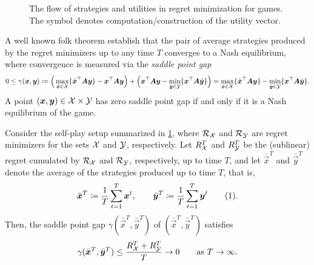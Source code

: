\documentclass{homework}
\begin{document}
\begin{figure}[h]
      \caption{The flow of strategies and utilities in regret minimization for games.
        The symbol \protect\computeutility{} denotes computation/construction of the utility vector.}
      \label{fig:no alternation}
    \end{figure}

    A well known folk theorem establish that the pair of average strategies produced by the regret minimizers up to any time $T$ converges to a Nash equilibrium, where convergence is measured via the \emph{saddle point gap}
    \[
        0 \le \gamma(\bm{x},\bm{y}) \coloneqq \Big(\max_{\hat{\bm{x}}\in\mathcal{X}} \{ \hat{\bm{x}}^\top \bm{A}\bm{y}  \} - \bm{x}^\top \bm{A} \bm{y}\Big) + \Big( \bm{x}^\top \bm{A} \bm{y} - \min_{\hat{\bm{y}} \in \mathcal{Y}} \{\bm{x}^\top \bm{A} \hat{\bm{y}}\}\Big) = \max_{\hat{\bm{x}}\in\mathcal{X}} \{ \hat{\bm{x}}^\top \bm{A}\bm{y}  \}  - \min_{\hat{\bm{y}}\in\mathcal{Y}} \{ \bm{x}^\top \bm{A}\hat{\bm{y}}  \}.
    \] 
    A point $(\bm{x},\bm{y})\in \mathcal{X}\times\mathcal{Y}$ has zero saddle point gap if and only if it is a Nash equilibrium of the game. 

    \begin{theorem}\label{thm:folk}
        Consider the self-play setup summarized in \cref{fig:no alternation}, where $\mathcal{R}_{\mathcal{X}}$ and $\mathcal{R}_{\mathcal{Y}}$ are regret minimizers for the sets $\mathcal{X}$ and $\mathcal{Y}$, respectively. Let $R_{\mathcal{X}}^T$ and $R_{\mathcal{Y}}^T$ be the (sublinear) regret cumulated by $\mathcal{R}_{\mathcal{X}}$ and $\mathcal{R}_{\mathcal{Y}}$, respectively, up to time $T$, and let $\bar{\vec{x}}^T$ and $\bar{\vec{y}}^T$ denote the average of the strategies produced up to time $T$, that is,
        \[
            \bar{\vec{x}}^T \defeq \frac{1}{T}\sum_{t=1}^T \vec{x}^t, \qquad  
            \bar{\vec{y}}^T \defeq \frac{1}{T}\sum_{t=1}^T \vec{y}^t  
            \numberthis{eq:constant avg}
        .\]
        Then, the saddle point gap $\gamma(\bar{\vec{x}}^T, \bar{\vec{y}}^T)$ of $(\bar{\vec{x}}^T, \bar{\vec{y}}^T)$ satisfies  
        \[
            \gamma(\bar{\bm{x}}^T, \bar{\bm{y}}^T) \le \frac{R_{\mathcal{X}}^T + R_{\mathcal{Y}}^T}{T} \to 0 \qquad \text{as } T\to\infty.  
        \]
\end{theorem}
\end{document}
